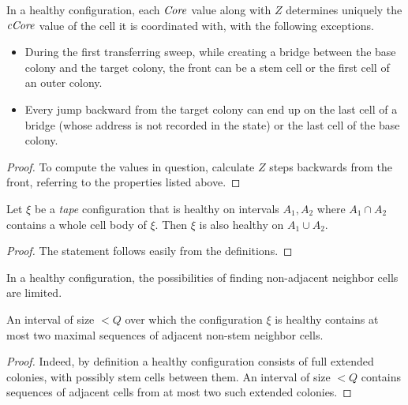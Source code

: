 \documentclass[12pt]{memoir}
\newcommand{\authnote}[3]
{\text{{ \textcolor{#3}{\( \langle\hspace{-0.2em}\langle \)\textsf{\footnotesize #1: #2}\( \rangle\hspace{-0.2em}\rangle \)}}}}
\newcommand{\authnote}[2]{}
\newcommand{\Pnote}[1]{{\authnote{P}{#1}{cyan}}}
\newcommand{\fld}[1]{\ensuremath{\textit{#1\/}}}
\newcommand{\Q}{Q}
\newcommand{\Z}{Z}
\newcommand{\Core}{\fld{Core}}
\newcommand{\cCore}{\fld{cCore}}
\begin{document}
\begin{lemma}\label{lem:coordination1}
  In a healthy configuration, each \( \Core \) 
  value along with \( \Z \) determines uniquely the 
  \( \cCore \) value of the cell it is coordinated with, with the following exceptions.
  \begin{itemize}
  \item During the first transferring sweep, while
    creating a bridge between the base colony and the target colony, 
    the front can be a stem cell or the first cell of an outer colony.
  \item Every jump backward from the target colony can end up on the last cell of a 
    bridge (whose address is not recorded in the state) or the last cell of the base colony.
  \end{itemize}
  \end{lemma}
  \begin{proof}
  To compute the values in question, calculate \( \Z \) steps backwards from the front,
  referring to the properties listed above.
\Pnote{Elaborate!}    
  \end{proof}

\begin{lemma}\label{lem:health-extension}
  Let \( \xi \) be a \emph{tape} configuration that is healthy on intervals \( A_{1}, A_{2} \) 
where \( A_{1}\cap A_{2} \) contains a whole cell body of \( \xi \).
Then \( \xi \) is also healthy on \( A_{1}\cup A_{2} \).
\end{lemma}
\begin{proof}
  The statement follows easily from the definitions.
\Pnote{Elaborate!}    
\end{proof}

In a healthy configuration, the possibilities of finding non-adjacent neighbor
cells are limited.

\begin{lemma}\label{lem:two-domains}
  An interval of size \( <\Q \) over which the configuration \( \xi \) is healthy
contains at most two maximal sequences of adjacent non-stem neighbor cells.
\end{lemma}
\begin{proof}
Indeed, by definition a healthy configuration consists of full extended colonies, with 
possibly stem cells between them.
An interval of size \( <\Q \) contains sequences of adjacent cells 
from at most two such extended colonies.
\end{proof}

\end{document}
